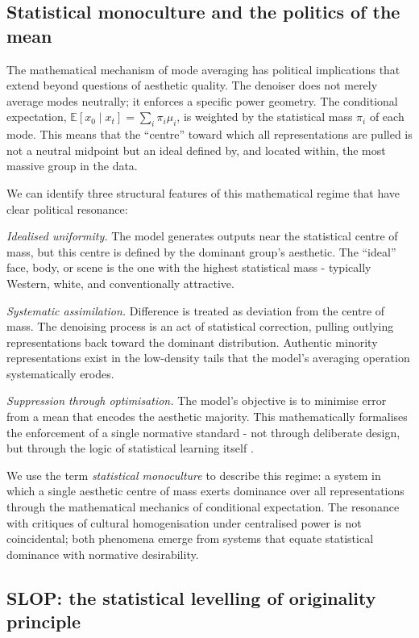 \documentclass[11pt]{article}
\begin{document}
\subsection{Statistical monoculture and the politics of the mean}

The mathematical mechanism of mode averaging has political implications that extend beyond questions of aesthetic quality. The denoiser does not merely average modes neutrally; it enforces a specific power geometry. The conditional expectation, $\mathbb{E}[x_0 \mid x_t] = \sum_i \pi_i \mu_i$, is weighted by the statistical mass $\pi_i$ of each mode. This means that the ``centre'' toward which all representations are pulled is not a neutral midpoint but an ideal defined by, and located within, the most massive group in the data.

We can identify three structural features of this mathematical regime that have clear political resonance:

\textit{Idealised uniformity.} The model generates outputs near the statistical centre of mass, but this centre is defined by the dominant group's aesthetic. The ``ideal'' face, body, or scene is the one with the highest statistical mass - typically Western, white, and conventionally attractive.

\textit{Systematic assimilation.} Difference is treated as deviation from the centre of mass. The denoising process is an act of statistical correction, pulling outlying representations back toward the dominant distribution. Authentic minority representations exist in the low-density tails that the model's averaging operation systematically erodes.

\textit{Suppression through optimisation.} The model's objective is to minimise error from a mean that encodes the aesthetic majority. This mathematically formalises the enforcement of a single normative standard - not through deliberate design, but through the logic of statistical learning itself \citep{Broussard2023}.

We use the term \textit{statistical monoculture} to describe this regime: a system in which a single aesthetic centre of mass exerts dominance over all representations through the mathematical mechanics of conditional expectation. The resonance with critiques of cultural homogenisation under centralised power is not coincidental; both phenomena emerge from systems that equate statistical dominance with normative desirability.

\subsection{SLOP: the statistical levelling of originality principle}
\end{document}
